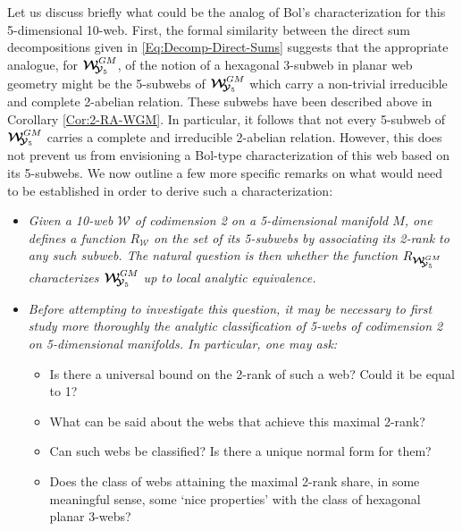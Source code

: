 \documentclass[11pt]{amsart}
\newcommand{\mk}{\medskip}
\begin{document}
Let us discuss briefly what could be the analog of Bol's characterization for this 5-dimensional 10-web.
First, the formal similarity between the direct sum decompositions given in
\eqref{Eq:Decomp-Direct-Sums} suggests that the appropriate analogue, for $\boldsymbol{\mathcal W}_{\hspace{-0.1cm} \boldsymbol{\mathcal Y}_5}^{GM}$, of the notion of a hexagonal 3-subweb in planar web geometry might be the 5-subwebs of $\boldsymbol{\mathcal W}_{\hspace{-0.1cm} \boldsymbol{\mathcal Y}_5}^{GM}$ which carry a non-trivial irreducible and complete 2-abelian relation. These subwebs have been described above in Corollary \ref{Cor:2-RA-WGM}. In particular, it follows that not every 5-subweb of $\boldsymbol{\mathcal W}_{\hspace{-0.1cm} \boldsymbol{\mathcal Y}_5}^{GM}$ carries a complete and irreducible 2-abelian relation. However, this does not prevent us from envisioning a Bol-type characterization of this web based on its 5-subwebs. We now outline a few more specific remarks on what would need to be established in order to derive such a characterization:
\begin{itemize}%
\item  {\it{Given a 10-web $\boldsymbol{\mathcal W}$ of codimension 2 on a 5-dimensional manifold $M$, 
one defines a function ${{R}}_{\boldsymbol{\mathcal W}}$ on the set 
of its 5-subwebs  by associating 
its 2-rank to any such subweb. 
The natural question is then whether the function 
 ${{R}}_{\boldsymbol{\mathcal W}_{\hspace{-0.1cm} \boldsymbol{\mathcal Y}_5}^{GM} }$ 
 characterizes 
   $\boldsymbol{\mathcal W}_{\hspace{-0.1cm} \boldsymbol{\mathcal Y}_5}^{GM}$ up to local 
   analytic equivalence.}}
   \mk 
\item {\it Before attempting to investigate this question, it may be necessary to first study more thoroughly the analytic classification of 5-webs of codimension 2 on 5-dimensional manifolds. In particular, one may ask:}
{\it \begin{itemize}
    \item  Is there a universal bound on the 2-rank of such a web? Could it be equal to 1?
    \item What can be said about the webs that achieve this maximal 2-rank?
    \item Can such webs be classified?
      Is there a unique normal form for them?
    \item Does the class of webs attaining the maximal 2-rank share, in some meaningful sense,  some `nice properties' with the class of
     hexagonal planar 3-webs?
\end{itemize}}
\end{itemize}
\end{document}

